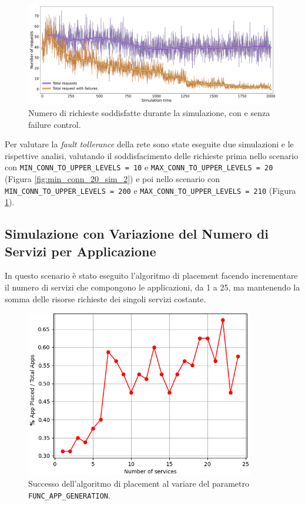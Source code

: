\begin{figure}[!ht]
  \includegraphics[width=12cm]{images/min_conn_200_sim_1}
  \centering
  \caption{Numero di richieste soddisfatte durante la simulazione, con e senza failure control.}
  \label{fig:min_conn_200_sim_1}
\end{figure}

Per valutare la \textit{fault tollerance} della rete sono state eseguite due simulazioni e le rispettive analisi, valutando il soddisfacimento delle richieste prima nello scenario con \texttt{MIN\_CONN\_TO\_UPPER\_LEVELS = 10} e \texttt{MAX\_CONN\_TO\_UPPER\_LEVELS = 20} (Figura \ref{fig:min_conn_20_sim_2}) e poi nello scenario con \texttt{MIN\_CONN\_TO\_UPPER\_LEVELS = 200} e \texttt{MAX\_CONN\_TO\_UPPER\_LEVELS = 210} (Figura \ref{fig:min_conn_200_sim_1}).



\subsection{Simulazione con Variazione del Numero di Servizi per Applicazione}

In questo scenario è stato eseguito l'algoritmo di placement facendo incrementare il numero di servizi che compongono le applicazioni, da 1 a 25, ma mantenendo la somma delle risorse richieste dei singoli servizi costante.

\begin{figure}[!ht]
  \includegraphics[width=10cm]{images/service_per_app_success}
  \centering
  \caption{Successo dell'algoritmo di placement al variare del parametro \texttt{FUNC\_APP\_GENERATION}.}
  \label{fig:service_per_app_success}
\end{figure}

